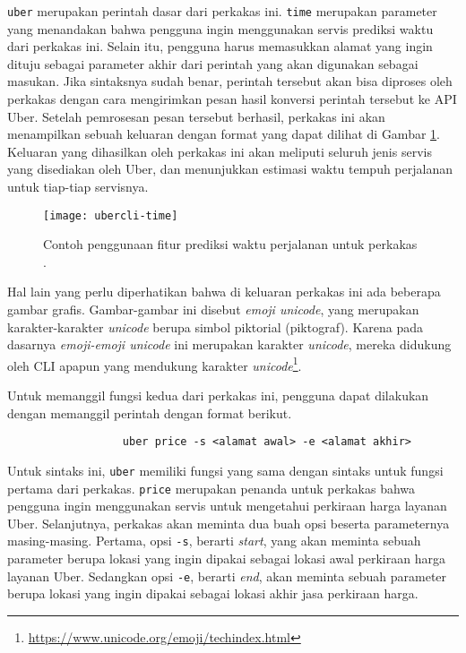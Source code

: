 \verb|uber| merupakan perintah dasar dari perkakas ini. \verb|time| merupakan parameter yang menandakan bahwa pengguna ingin menggunakan servis prediksi waktu dari perkakas ini. Selain itu, pengguna harus memasukkan alamat yang ingin dituju sebagai parameter akhir dari perintah yang akan digunakan sebagai masukan. Jika sintaksnya sudah benar, perintah tersebut akan bisa diproses oleh perkakas dengan cara mengirimkan pesan hasil konversi perintah tersebut ke API Uber. Setelah pemrosesan pesan tersebut berhasil, perkakas ini akan menampilkan sebuah keluaran dengan format yang dapat dilihat di Gambar \ref{fig:similarapps-ubercli-time}. Keluaran yang dihasilkan oleh perkakas ini akan meliputi seluruh jenis servis yang disediakan oleh Uber, dan menunjukkan estimasi waktu tempuh perjalanan untuk tiap-tiap servisnya.
\vspace*{1em} %
\begin{figure}[h]
    \centering
    \texttt{[image: ubercli-time]}
    \caption[Contoh penggunaan perkakas \ubercli (\textit{time})]{Contoh penggunaan fitur prediksi waktu perjalanan untuk perkakas \ubercli.\protect\footnotemark}
    \label{fig:similarapps-ubercli-time}
\end{figure}
\newpage %
Hal lain yang perlu diperhatikan bahwa di keluaran perkakas ini ada beberapa gambar grafis. Gambar-gambar ini disebut \textit{emoji unicode}, yang merupakan karakter-karakter \textit{unicode} berupa simbol piktorial (piktograf). Karena pada dasarnya \textit{emoji-emoji unicode} ini merupakan karakter \textit{unicode}, mereka didukung oleh CLI apapun yang mendukung karakter \textit{unicode}\footnote{\href{https://www.unicode.org/emoji/techindex.html}{https://www.unicode.org/emoji/techindex.html}}.

Untuk memanggil fungsi kedua dari perkakas ini, pengguna dapat dilakukan dengan memanggil perintah dengan format berikut.
\vspace{0.25em} %
\begin{verbatim}
                  uber price -s <alamat awal> -e <alamat akhir>
\end{verbatim}
\vspace{0.25em} %
Untuk sintaks ini, \verb|uber| memiliki fungsi yang sama dengan sintaks untuk fungsi pertama dari perkakas. \verb|price| merupakan penanda untuk perkakas bahwa pengguna ingin menggunakan servis untuk mengetahui perkiraan harga layanan Uber. Selanjutnya, perkakas akan meminta dua buah opsi beserta parameternya masing-masing. Pertama, opsi \verb|-s|, berarti \textit{start}, yang akan meminta sebuah parameter berupa lokasi yang ingin dipakai sebagai lokasi awal perkiraan harga layanan Uber. Sedangkan opsi \verb|-e|, berarti \textit{end}, akan meminta sebuah parameter berupa lokasi yang ingin dipakai sebagai lokasi akhir jasa perkiraan harga.

